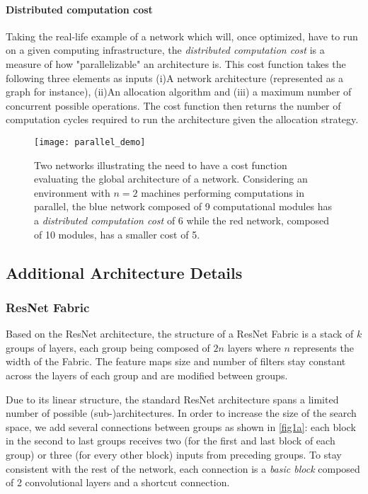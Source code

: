 \documentclass[10pt,twocolumn,letterpaper]{article}
\begin{document}
\paragraph*{Distributed computation cost} Taking the real-life example of a network which will, once optimized, have to run on a given computing infrastructure, the \textit{distributed computation cost} is a measure of how "parallelizable" an architecture is. This cost function takes the following three elements as inputs (i)A network architecture (represented as a graph for instance), (ii)An allocation algorithm and (iii) a maximum number of concurrent possible operations. The cost function then returns the number of computation cycles required to run the architecture given the allocation strategy.
\begin{figure}[ht]
	\centering
    \texttt{[image: parallel\_demo]}
	\caption{Two networks illustrating the need to have a cost function evaluating the global architecture of a network. Considering an environment with $n=2$ machines performing computations in parallel, the blue network composed of 9 computational modules has a \textit{distributed computation cost} of 6 while the red network, composed of 10 modules, has a smaller cost of 5.}
\label{parallel_ex}
\end{figure}




\subsection*{Additional Architecture Details}
\subsubsection*{ResNet Fabric}
Based on the ResNet architecture, the structure of a ResNet Fabric is a stack of $k$ groups of layers, each group being composed of $2n$ layers where $n$ represents the width of the Fabric. The feature maps size and number of filters stay constant across the layers of each group and are modified between groups.

Due to its linear structure, the standard ResNet architecture spans a limited number of possible (sub-)architectures. In order to increase the size of the search space, we add several connections between groups as shown in \ref{fig1a}: each block in the second to last groups receives two (for the first and last block of each group) or three (for every other block) inputs from preceding groups. To stay consistent with the rest of the network, each connection is a \textit{basic block} \cite{DBLP:journals/corr/HeZRS15} composed of 2 convolutional layers and a shortcut connection.
\end{document}
